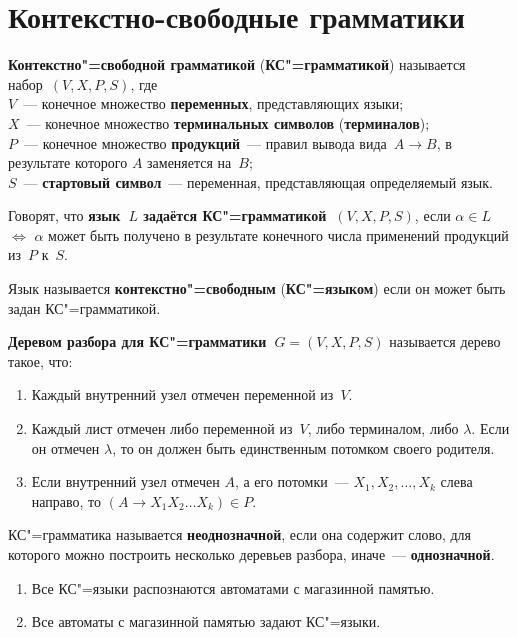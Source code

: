 \section{Контекстно-свободные грамматики}
  \textbf{Контекстно"=свободной грамматикой} (\textbf{КС"=грамматикой}) называется набор~$(V, X, P, S)$, где\\
$V$~--- конечное множество \textbf{переменных}, представляющих языки;\\
$X$~--- конечное множество \textbf{терминальных символов} (\textbf{терминалов});\\
$P$~--- конечное множество \textbf{продукций}~--- правил вывода вида~$A \to B$, в результате которого $A$ заменяется на~$B$;\\
$S$~--- \textbf{стартовый символ}~--- переменная, представляющая определяемый язык.

Говорят, что \textbf{язык~$L$ задаётся КС"=грамматикой~$(V, X, P, S)$}, если $\alpha \in L$ $\Leftrightarrow$ $\alpha$ может быть получено в результате конечного числа применений продукций из~$P$ к~$S$.

 Язык называется \textbf{контекстно"=свободным} (\textbf{КС"=языком}) если он может быть задан КС"=грамматикой.

\textbf{Деревом разбора для КС"=грамматики~$G = (V, X, P, S)$} называется дерево такое, что:
\begin{enumerate}
	\item Каждый внутренний узел отмечен переменной из~$V$.
	\item Каждый лист отмечен либо переменной из~$V$, либо терминалом, либо $\lambda$.
	Если он отмечен $\lambda$, то он должен быть единственным потомком своего родителя.
	\item Если внутренний узел отмечен $A$, а его потомки~--- $X_1, X_2, \ldots, X_k$ слева направо, то $(A \to X_1 X_2 \ldots X_k) \in P$.
\end{enumerate}

КС"=грамматика называется \textbf{неоднозначной}, если она содержит слово, для которого можно построить несколько деревьев разбора, иначе~--- \textbf{однозначной}.

\begin{theorem}
\begin{enumerate}
	\item Все КС"=языки распознаются автоматами с магазинной памятью.
	\item Все автоматы с магазинной памятью задают КС"=языки.
\end{enumerate}
\end{theorem}

